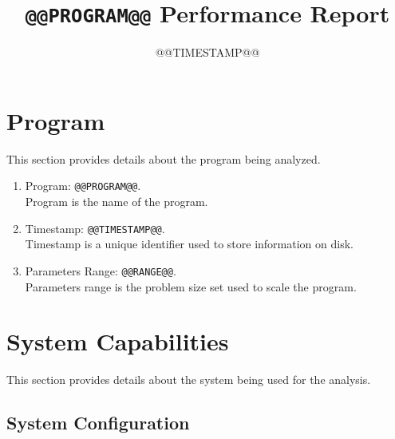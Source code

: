 \documentclass[a4paper]{article}
\begin{document}
\title{{\tt @@PROGRAM@@} Performance Report}

\date{@@TIMESTAMP@@}
\author{}

\maketitle


\begin{multicols}{2}
  \tableofcontents
\end{multicols}

\section{Program}

This section provides details about the program being analyzed.

\begin{enumerate}
\item Program: {\tt @@PROGRAM@@}. \\Program is the name of the program.
\item Timestamp: {\tt @@TIMESTAMP@@}. \\Timestamp is a unique identifier used to store information on disk.
\item Parameters Range: {\tt @@RANGE@@}. \\Parameters range is the problem size set used to scale the program. 
\end{enumerate}

\section{System Capabilities}

This section provides details about the system being used for the analysis.

\subsection{System Configuration}
\end{document}
